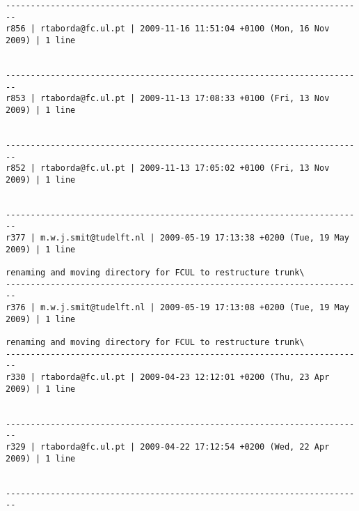 \documentclass[9]{report}
\begin{document}
\begin{description}
\begin{verbatim}
------------------------------------------------------------------------
r856 | rtaborda@fc.ul.pt | 2009-11-16 11:51:04 +0100 (Mon, 16 Nov 2009) | 1 line


------------------------------------------------------------------------
r853 | rtaborda@fc.ul.pt | 2009-11-13 17:08:33 +0100 (Fri, 13 Nov 2009) | 1 line


------------------------------------------------------------------------
r852 | rtaborda@fc.ul.pt | 2009-11-13 17:05:02 +0100 (Fri, 13 Nov 2009) | 1 line


------------------------------------------------------------------------
r377 | m.w.j.smit@tudelft.nl | 2009-05-19 17:13:38 +0200 (Tue, 19 May 2009) | 1 line

renaming and moving directory for FCUL to restructure trunk\
------------------------------------------------------------------------
r376 | m.w.j.smit@tudelft.nl | 2009-05-19 17:13:08 +0200 (Tue, 19 May 2009) | 1 line

renaming and moving directory for FCUL to restructure trunk\
------------------------------------------------------------------------
r330 | rtaborda@fc.ul.pt | 2009-04-23 12:12:01 +0200 (Thu, 23 Apr 2009) | 1 line


------------------------------------------------------------------------
r329 | rtaborda@fc.ul.pt | 2009-04-22 17:12:54 +0200 (Wed, 22 Apr 2009) | 1 line


------------------------------------------------------------------------


\end{verbatim}
\end{description}
\end{document}
